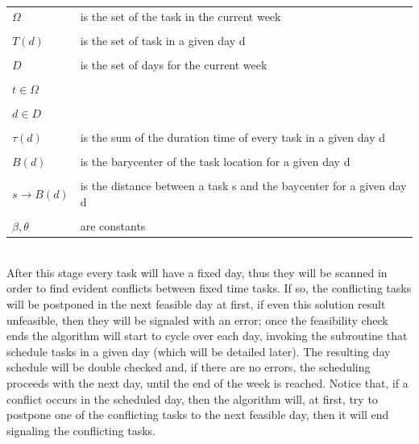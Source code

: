     \begin{table}[H]
        \centering
        \begin{tabular}{p{2.3cm} p{7cm}}
            \\ $ \Omega$ & is the set of the task in the current week \\
            \\ $ T(d) $  & is the set of task in a given day d \\
            \\ $ D $     & is the set of days for the current week  \\
            \\ $t \in \Omega $ &  \\
            \\ $ d \in D $ & \\
            \\ $ \tau(d)$ & is the sum of the duration time of every task in a given day d  \\
            \\ $ B(d) $ & is the barycenter of the task location for a given day d\\
            \\ $s \rightarrow B(d)$ & is the distance between a task s and the baycenter for a given day d\\
            \\ $\beta, \theta$ & are constants  \\
        \end{tabular}
    \end{table}
    
\\After this stage every task will have a fixed day, thus they will be scanned in order to find evident conflicts between fixed time tasks.
If so, the conflicting tasks will be postponed in the next feasible day at first, if even this solution result unfeasible, then they will be signaled with an error; once the feasibility check ends the algorithm will start to cycle over each day, invoking the subroutine that schedule tasks in a given day (which will be detailed later). 
 The resulting day schedule will be double checked and, if there are no errors, the scheduling proceeds with the next day, until the end of the week is reached. Notice that, if a conflict occurs in the scheduled day, then the algorithm will, at first, try to postpone one of the conflicting tasks to the next feasible day, then it will end signaling the conflicting tasks.   
 
